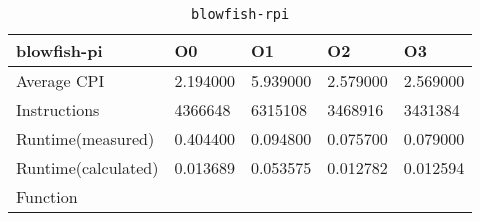 \begin{table}[ht!]
\centering
\caption{\texttt{blowfish-rpi}}
\label{tab:blowfish-rpi}
\begin{tabular}{|l|l|l|l|l|}
\hline
\textbf{blowfish-pi}	&	\textbf{O0}	&	\textbf{O1}	&	\textbf{O2}	&	\textbf{O3}	\\\hline\hline
Average CPI	&	2.194000	&	5.939000	&	2.579000	&	2.569000	\\\hline
Instructions	&	4366648	&	6315108	&	3468916	&	3431384	\\\hline
Runtime(measured)	&	0.404400	&	0.094800	&	0.075700	&	0.079000	\\\hline
Runtime(calculated)	&	0.013689	&	0.053575	&	0.012782	&	0.012594	\\\hline
Function	&		&		&		&		\\\hline
\end{tabular}
\end{table}
